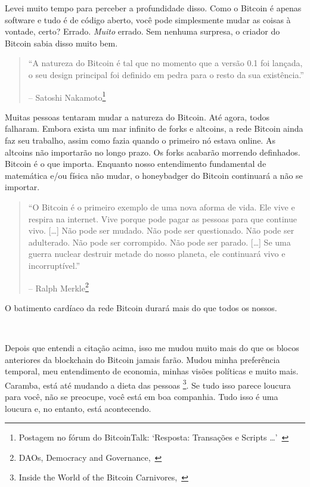 Levei muito tempo para perceber a profundidade disso. Como o Bitcoin é apenas software e tudo é de código aberto, você pode simplesmente mudar as coisas à vontade, certo? Errado. \textit {Muito} errado. Sem nenhuma surpresa, o criador do Bitcoin sabia disso muito bem.

\begin{quotation}\begin{samepage}
\enquote{A natureza do Bitcoin é tal que no momento que a versão 0.1 foi lançada, o seu design principal foi definido em pedra para o resto da sua existência.}
\begin{flushright} -- Satoshi Nakamoto\footnote{Postagem no fórum do BitcoinTalk: `Resposta: Transações e Scripts \ldots'~\cite{satoshi-set-in-stone}}
\end{flushright}\end{samepage}\end{quotation}

Muitas pessoas tentaram mudar a natureza do Bitcoin. Até agora, todos falharam. Embora exista um mar infinito de forks e altcoins, a rede Bitcoin ainda faz seu trabalho, assim como fazia quando o primeiro nó estava online. As altcoins não importarão no longo prazo. Os forks acabarão morrendo definhados. Bitcoin é o que importa. Enquanto nosso entendimento fundamental de matemática e/ou física não mudar, o honeybadger do Bitcoin continuará a não se importar.


\begin{quotation}\begin{samepage}
\enquote{O Bitcoin é o primeiro exemplo de uma nova aforma de vida. Ele vive e respira na internet. Vive porque pode pagar as pessoas para que continue vivo. [\ldots] Não pode ser mudado. Não pode ser questionado. Não pode ser adulterado. Não pode ser corrompido. Não pode ser parado. [\ldots] Se uma guerra nuclear destruir metade do nosso planeta, ele continuará vivo e incorruptível.}
\begin{flushright} -- Ralph Merkle\footnote{DAOs, Democracy and
Governance,~\cite{merkle-dao}}
\end{flushright}\end{samepage}\end{quotation}

O batimento cardíaco da rede Bitcoin durará mais do que todos os nossos.

~

Depois que entendi a citação acima, isso me mudou muito mais do que os blocos anteriores da blockchain do Bitcoin jamais farão. Mudou minha preferência temporal, meu entendimento de economia, minhas visões políticas e muito mais. Caramba, está até mudando a dieta das pessoas \footnote{Inside the World of the Bitcoin
Carnivores,~\cite{carnivores}}. Se tudo isso parece loucura para você, não se preocupe, você está em boa companhia. Tudo isso é uma loucura e, no entanto, está acontecendo.

